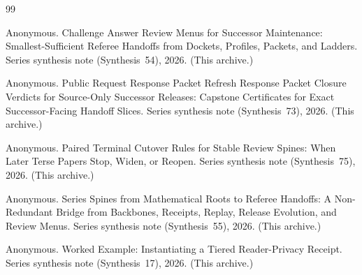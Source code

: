 \documentclass[11pt]{article}
\begin{document}
\begin{thebibliography}{99}\small

Anonymous.
\newblock Challenge Answer Review Menus for Successor Maintenance: Smallest-Sufficient Referee Handoffs from Dockets, Profiles, Packets, and Ladders.
\newblock Series synthesis note (Synthesis~54), 2026. (This archive.)

Anonymous.
\newblock Public Request Response Packet Refresh Response Packet Closure Verdicts for Source-Only Successor Releases: Capstone Certificates for Exact Successor-Facing Handoff Slices.
\newblock Series synthesis note (Synthesis~73), 2026. (This archive.)

Anonymous.
\newblock Paired Terminal Cutover Rules for Stable Review Spines: When Later Terse Papers Stop, Widen, or Reopen.
\newblock Series synthesis note (Synthesis~75), 2026. (This archive.)

Anonymous.
\newblock Series Spines from Mathematical Roots to Referee Handoffs: A Non-Redundant Bridge from Backbones, Receipts, Replay, Release Evolution, and Review Menus.
\newblock Series synthesis note (Synthesis~55), 2026. (This archive.)

Anonymous.
\newblock Worked Example: Instantiating a Tiered Reader-Privacy Receipt.
\newblock Series synthesis note (Synthesis~17), 2026. (This archive.)

\end{thebibliography}
\end{document}
